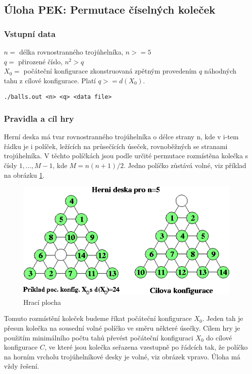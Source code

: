 \documentclass[12pt,a4paper]{article}
\begin{document}
\subsection{Úloha PEK: Permutace číselných koleček}

\subsubsection{Vstupní data}

$ n = $ délka rovnostranného trojúhelníka, $ n >= 5 $ \\
$ q = $ přirozené číslo, $n^{2} > q $ \\
$ X_{0} = $ počáteční konfigurace zkonstruovaná zpětným provedením $ q $ náhodných tahu z cílové konfigurace. Platí $ q>=d(X_{0}) $. \\
\begin{verbatim}
./balls.out <n> <q> <data file>
\end{verbatim}

\subsubsection{Pravidla a cíl hry}

Herní deska má tvar rovnostranného trojúhelníka o délce strany n, kde v i-tem řádku je i políček, ležících na průsečících úseček, rovnoběžných se stranami trojúhelníka. V těchto políčkách jsou podle určité permutace rozmístěna kolečka s čísly $ 1, \dots ,M-1 $, kde $ M=n(n+1)/2 $. Jedno políčko zůstává volné, viz příklad na obrázku \ref{pek}.

\begin{figure}[ht]
\includegraphics[width=\textwidth]{pek.png}
\caption{Hrací plocha}
\label{pek}
\end{figure}

Tomuto rozmístění koleček budeme říkat počáteční konfigurace $ X_{0} $. Jeden tah je přesun kolečka na sousední volné políčko ve směru některé úsečky. Cílem hry je použitím minimálního počtu tahů převést počáteční konfiguraci $ X_{0} $ do cílové konfigurace $ C $, ve které jsou kolečka seřazena vzestupně po řádcích tak, že políčko na horním vrcholu trojúhelníkové desky je volné, viz obrázek vpravo. Úloha má vždy řešení.
\end{document}
